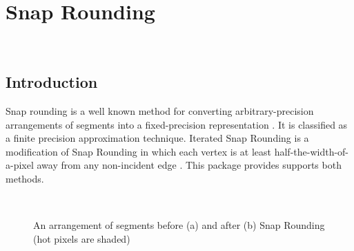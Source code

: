 
\ccParDims


\chapter{Snap Rounding}
\label{chapterSnapRoundibg}
\\
\newcommand{\reals}{{\rm I\!\hspace{-0.025em} R}}
\def\A{{\cal A}}
\def\S{{\cal S}}

\section{Introduction}
Snap rounding is a well known method for converting
arbitrary-precision arrangements of segments into a fixed-precision
representation \cite{gght-srlse-97, gm-rad-98, h-psifp-99}. It is classified
as a finite precision approximation technique. Iterated Snap Rounding is
a modification of Snap Rounding in which each vertex is at least
half-the-width-of-a-pixel away from any non-incident edge \cite{isr-2002}.
This package provides supports both methods.

\begin{figure}
\begin{center}
\  \
\end{center}
\vspace{-2ex}
\caption{An arrangement of segments before (a) and after (b)
Snap Rounding (hot pixels are shaded)}
\label{fig:sr1}
\end{figure}


